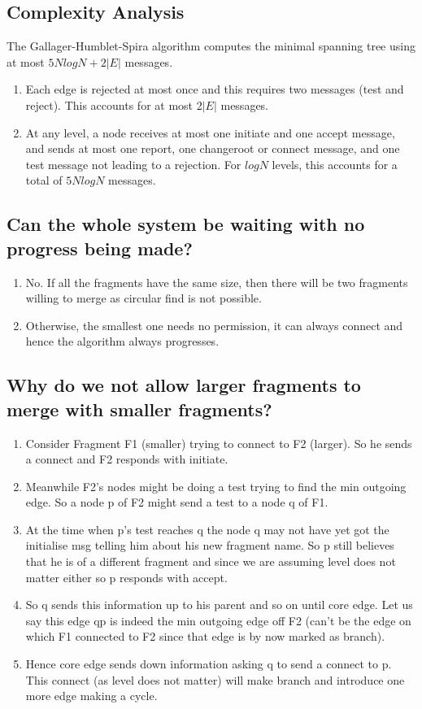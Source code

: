 \documentclass[twoside]{article}
\begin{document}
\subsection{Complexity Analysis}
The Gallager-Humblet-Spira algorithm computes the minimal spanning tree using at most $5N logN + 2|E|$ messages. 
\begin{enumerate}
\item Each edge is rejected at most once and this requires two messages (test and reject). This accounts for at most 2$|E|$ messages.
\item  At any level, a node receives at most one initiate and one accept message, and sends at most one report, one changeroot or connect message, and one test message not leading to a rejection. For $logN$ levels, this accounts for a total of $5N logN$ messages.

\end{enumerate}

\subsection{Can the whole system be waiting with no progress being made?}
\begin{enumerate}
    \item No. If all the fragments have the same size, then there will be two fragments willing to merge as circular find is not possible.
    \item Otherwise, the smallest one needs no permission, it can always connect and hence the algorithm always progresses.
\end{enumerate}

\subsection{Why do we not allow larger fragments to merge with smaller fragments?}

\begin{enumerate}
\item Consider Fragment F1 (smaller) trying to connect to F2 (larger). So he sends a connect and F2 responds with initiate.
\item Meanwhile F2’s nodes might be doing a test trying to find the min outgoing edge. So a node p of F2 might send a test to a node q of F1.
\item At the time when p’s test reaches q the node q may not have yet got the initialise msg telling him about his new fragment name. So p still believes that he is of a different fragment and since we are assuming level does not matter either so p responds with accept.
\item So q sends this information up to his parent and so on until core edge. Let us say this edge qp is indeed the min outgoing edge off F2 (can’t be the edge on which F1 connected to F2 since that edge is by now marked as branch).
\item Hence core edge sends down information asking q to send a connect to p. This connect  (as level does not matter) will make branch and introduce one more edge making a cycle.
\end{enumerate}
\end{document}
